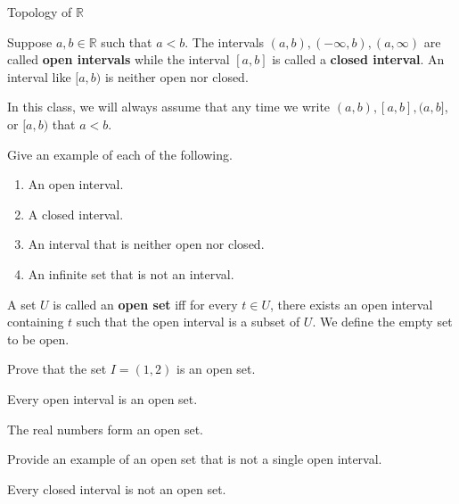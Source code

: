 \begin{section}{Topology of $\mathbb{R}$}
\begin{definition}
Suppose $a,b\in\mathbb{R}$ such that $a<b$.  The intervals $(a,b), (-\infty,b), (a,\infty)$ are called \textbf{open intervals} while the interval $[a,b]$ is called a \textbf{closed interval}.  An interval like $[a,b)$ is neither open nor closed.
\end{definition}

\begin{remark} 
In this class, we will always assume that any time we write $(a,b), [a,b], (a,b]$, or $[a,b)$ that $a<b$. 
\end{remark}

\begin{exercise} Give an example of each of the following.
\begin{enumerate}
\item An open interval.
\item A closed interval.
\item An interval that is neither open nor closed.
\item An infinite set that is not an interval.
\end{enumerate}
\end{exercise}

\begin{definition}
A set $U$ is called an \textbf{open set} iff for every $t \in U$, there exists an open interval containing $t$ such that the open interval is a subset of $U$.  We define the empty set to be open.\end{definition}

\begin{problem} 
Prove that the set $I=(1,2)$ is an open set.
\end{problem}

\begin{theorem}
Every open interval is an open set. 
\end{theorem}

\begin{theorem}
The real numbers form an open set.
\end{theorem}

\begin{exercise}
Provide an example of an open set that is not a single open interval.
\end{exercise}

\begin{theorem}
Every closed interval is not an open set.
\end{theorem}


\end{section}
